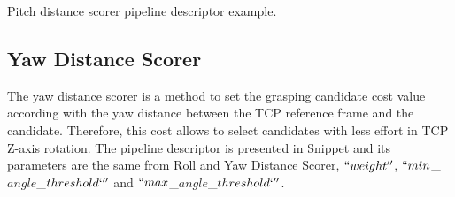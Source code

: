 

\begin{snippet}
\centering
{}
\caption{Pitch distance scorer pipeline descriptor example.}
\label{code:pitch_distance_scorer}
\end{snippet}

\subsection{Yaw Distance Scorer}
\label{cap4:modular_grasping_architecture:sec:grasp_selection:subsec:yaw_distance}

The yaw distance scorer is a method to set the grasping candidate cost value according with the yaw distance between the TCP reference frame and the candidate. Therefore, this cost allows to select candidates with less effort in TCP Z-axis rotation. The pipeline descriptor is presented in Snippet and its parameters are the same from Roll and Yaw Distance Scorer, $``weight''$, $``min$\_$angle$\_$threshold`''$ and $``max$\_$angle$\_$threshold`''$.



